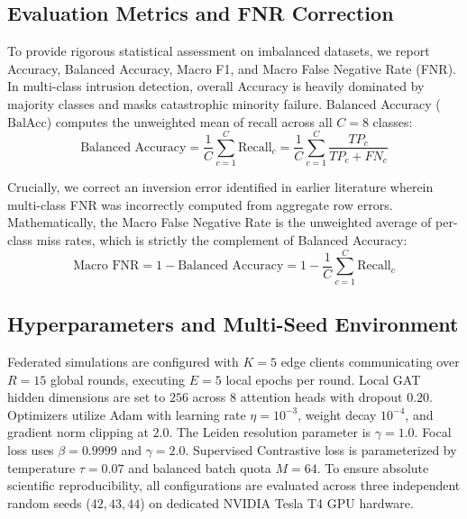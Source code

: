 \documentclass[journal,onecolumn]{IEEEtran}
\begin{document}
\subsection{Evaluation Metrics and FNR Correction}
To provide rigorous statistical assessment on imbalanced datasets, we report Accuracy, Balanced Accuracy, Macro F1, and Macro False Negative Rate (FNR). In multi-class intrusion detection, overall Accuracy is heavily dominated by majority classes and masks catastrophic minority failure. Balanced Accuracy ($\text{BalAcc}$) computes the unweighted mean of recall across all $C = 8$ classes:
\begin{equation}
\text{Balanced Accuracy} = \frac{1}{C} \sum_{c=1}^C \text{Recall}_c = \frac{1}{C} \sum_{c=1}^C \frac{TP_c}{TP_c + FN_c}
\label{eq:balanced_accuracy}
\end{equation}

Crucially, we correct an inversion error identified in earlier literature wherein multi-class FNR was incorrectly computed from aggregate row errors. Mathematically, the Macro False Negative Rate is the unweighted average of per-class miss rates, which is strictly the complement of Balanced Accuracy:
\begin{equation}
\text{Macro FNR} = 1 - \text{Balanced Accuracy} = 1 - \frac{1}{C} \sum_{c=1}^C \text{Recall}_c
\label{eq:macro_fnr}
\end{equation}

\subsection{Hyperparameters and Multi-Seed Environment}
Federated simulations are configured with $K = 5$ edge clients communicating over $R = 15$ global rounds, executing $E = 5$ local epochs per round. Local GAT hidden dimensions are set to $256$ across $8$ attention heads with dropout $0.20$. Optimizers utilize Adam with learning rate $\eta = 10^{-3}$, weight decay $10^{-4}$, and gradient norm clipping at $2.0$. The Leiden resolution parameter is $\gamma = 1.0$. Focal loss uses $\beta = 0.9999$ and $\gamma = 2.0$. Supervised Contrastive loss is parameterized by temperature $\tau = 0.07$ and balanced batch quota $M = 64$. To ensure absolute scientific reproducibility, all configurations are evaluated across three independent random seeds ($42, 43, 44$) on dedicated NVIDIA Tesla T4 GPU hardware.
\end{document}
